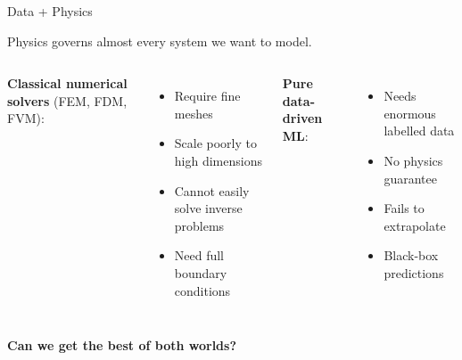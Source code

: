 \documentclass[aspectratio=169,xcolor=dvipsnames,svgnames,x11names,fleqn]{beamer}
\begin{document}
\begin{frame}{Data + Physics}

\begin{center}
\color{DarkBlue}\Large
Physics governs almost every system we want to model.
\end{center}

\vspace{10pt}
\begin{columns}
  \textbf{Classical numerical solvers} (FEM, FDM, FVM):
  \begin{itemize}
    \item Require fine meshes
    \item Scale poorly to high dimensions
    \item Cannot easily solve inverse problems
    \item Need full boundary conditions
  \end{itemize}

  \textbf{Pure data-driven ML}:
  \begin{itemize}
    \item Needs enormous labelled data
    \item No physics guarantee
    \item Fails to extrapolate
    \item Black-box predictions
  \end{itemize}
\end{columns}

\vspace{10pt}
\begin{center}
\color{DarkGreen}\Large
\textbf{Can we get the best of both worlds?}
\end{center}


\end{frame}
\end{document}
